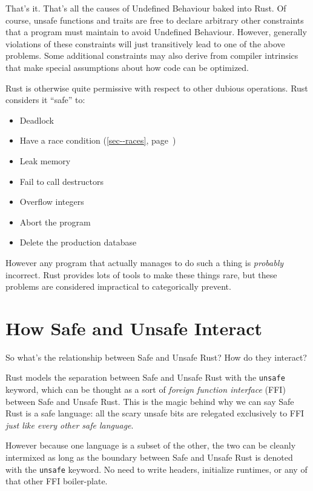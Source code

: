 \documentclass[a4paper,]{book}
\renewcommand*{\hyperref}[2][\ar]{%
  \def\ar{#2}%
  #2 (\autoref{#1}, page~\pageref{#1})}
\providecommand{\tightlist}{%
  \setlength{\itemsep}{0pt}\setlength{\parskip}{0pt}}
\begin{document}
That's it. That's all the causes of Undefined Behaviour baked into Rust.
Of course, unsafe functions and traits are free to declare arbitrary
other constraints that a program must maintain to avoid Undefined
Behaviour. However, generally violations of these constraints will just
transitively lead to one of the above problems. Some additional
constraints may also derive from compiler intrinsics that make special
assumptions about how code can be optimized.

Rust is otherwise quite permissive with respect to other dubious
operations. Rust considers it ``safe'' to:

\begin{itemize}
\tightlist
\item
  Deadlock
\item
  Have a \hyperref[sec--races]{race condition}
\item
  Leak memory
\item
  Fail to call destructors
\item
  Overflow integers
\item
  Abort the program
\item
  Delete the production database
\end{itemize}

However any program that actually manages to do such a thing is
\emph{probably} incorrect. Rust provides lots of tools to make these
things rare, but these problems are considered impractical to
categorically prevent.

\section{How Safe and Unsafe Interact}\label{sec--safe-unsafe-meaning}

So what's the relationship between Safe and Unsafe Rust? How do they
interact?

Rust models the separation between Safe and Unsafe Rust with the
\texttt{unsafe} keyword, which can be thought as a sort of \emph{foreign
function interface} (FFI) between Safe and Unsafe Rust. This is the
magic behind why we can say Safe Rust is a safe language: all the scary
unsafe bits are relegated exclusively to FFI \emph{just like every other
safe language}.

However because one language is a subset of the other, the two can be
cleanly intermixed as long as the boundary between Safe and Unsafe Rust
is denoted with the \texttt{unsafe} keyword. No need to write headers,
initialize runtimes, or any of that other FFI boiler-plate.
\end{document}
